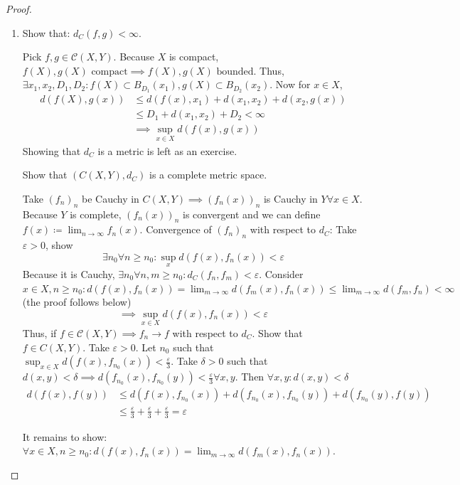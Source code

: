 \documentclass[a4paper]{article}
\numberwithin{lecref}{section}
\begin{document}
\begin{proof}
	\begin{enumerate}
		\item Show that: $d_C(f, g) < \infty$.

			Pick $f, g \in \mathcal C(X, Y)$. Because $X$ is compact, $f(X), g(X) \text{ compact} \implies f(X), g(X) \text{ bounded}$.
			Thus, $\exists x_1, x_2, D_1, D_2: f(X) \subset B_{D_1}(x_1), g(X) \subset B_{D_2}(x_2)$.
			Now for $x \in X$,
			\begin{align*}
				d(f(X), g(x)) &\leq d(f(x), x_1) + d(x_1, x_2) + d(x_2, g(x)) \\
					&\leq D_1 + d(x_1, x_2) + D_2 < \infty \\
					&\implies \sup_{x \in X} d(f(x), g(x))
			\end{align*}
			Showing that $d_C$ is a metric is left as an exercise.

			Show that $(C(X, Y), d_C)$ is a complete metric space.

			Take $(f_n)_n$ be Cauchy in $C(X, Y) \implies (f_n(x))_n$ is Cauchy in $Y \forall x \in X$.
			Because $Y$ is complete, $(f_n(x))_n$ is convergent and we can define $f(x) \coloneqq \lim_{n \to \infty} f_n(x)$.
			Convergence of $(f_n)_n$ with respect to $d_C$:
			Take $\varepsilon > 0$, show
			\[ \exists n_0 \forall n \geq n_0: \sup_x d(f(x), f_n(x)) < \varepsilon \]
			Because it is Cauchy, $\exists n_0 \forall n, m \geq n_0: d_C(f_n, f_m) < \varepsilon$.
			Consider $x \in X, n \geq n_0: d(f(x), f_n(x)) = \lim_{m \to \infty} d(f_m(x), f_n(x)) \leq \lim_{m\to\infty} d(f_m, f_n) < \infty$ (the proof follows below)
			\[ \implies \sup_{x \in X} d(f(x), f_n(x)) < \varepsilon \]
			Thus, if $f \in \mathcal C(X, Y) \implies f_n \to f$ with respect to $d_C$.
			Show that $f \in C(X, Y)$. Take $\varepsilon > 0$. Let $n_0$ such that $\sup_{x \in X} d(f(x), f_{n_0}(x)) < \frac{\varepsilon}{3}$.
			Take $\delta > 0$ such that $d(x, y) < \delta \implies d(f_{n_0}(x), f_{n_0}(y)) < \frac\varepsilon3 \forall x, y$.
			Then $\forall x, y: d(x, y) < \delta$
			\begin{align*}
				d(f(x), f(y))
					&\leq  d(f(x), f_{n_0}(x)) + d(f_{n_0}(x), f_{n_0}(y)) + d(f_{n_0}(y), f(y)) \\
					&\leq \frac\varepsilon3 + \frac\varepsilon3 + \frac\varepsilon3 = \varepsilon
			\end{align*}

			It remains to show: $\forall x \in X, n \geq n_0: d(f(x), f_n(x)) = \lim_{m \to \infty} d(f_m(x), f_n(x))$.


\end{enumerate}
\end{proof}
\end{document}
